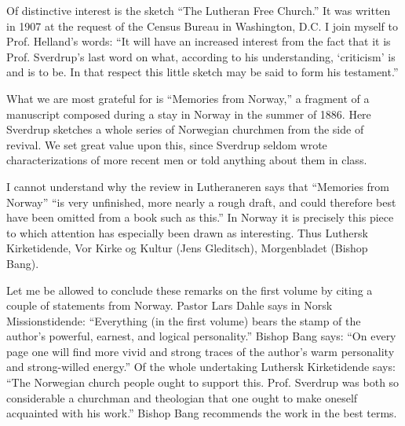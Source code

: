 Of distinctive interest is the sketch “The Lutheran Free Church.” It was written in 1907 at the request of the Census Bureau in Washington, D.C. I join myself to Prof. Helland’s words: “It will have an increased interest from the fact that it is Prof. Sverdrup’s last word on what, according to his understanding, ‘criticism’ is and is to be. In that respect this little sketch may be said to form his testament.”

What we are most grateful for is “Memories from Norway,” a fragment of a manuscript composed during a stay in Norway in the summer of 1886. Here Sverdrup sketches a whole series of Norwegian churchmen from the side of revival. We set great value upon this, since Sverdrup seldom wrote characterizations of more recent men or told anything about them in class.

I cannot understand why the review in Lutheraneren says that “Memories from Norway” “is very unfinished, more nearly a rough draft, and could therefore best have been omitted from a book such as this.” In Norway it is precisely this piece to which attention has especially been drawn as interesting. Thus Luthersk Kirketidende, Vor Kirke og Kultur (Jens Gleditsch), Morgenbladet (Bishop Bang).

Let me be allowed to conclude these remarks on the first volume by citing a couple of statements from Norway. Pastor Lars Dahle says in Norsk Missionstidende: “Everything (in the first volume) bears the stamp of the author’s powerful, earnest, and logical personality.” Bishop Bang says: “On every page one will find more vivid and strong traces of the author’s warm personality and strong-willed energy.” Of the whole undertaking Luthersk Kirketidende says: “The Norwegian church people ought to support this. Prof. Sverdrup was both so considerable a churchman and theologian that one ought to make oneself acquainted with his work.” Bishop Bang recommends the work in the best terms.
